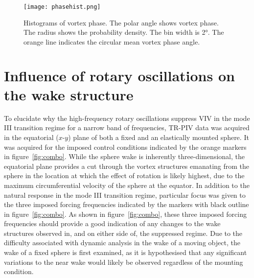 \documentclass[3p]{elsarticle}
\begin{document}
\begin{figure}
	\centering
	\texttt{[image: phasehist.png]} %
	\caption{Histograms of vortex phase. The polar angle shows vortex phase. The radius shows the probability density. The bin width is \ang{2}. The orange line indicates the circular mean vortex phase angle.}
	\label{fig:phasehist}
\end{figure}
%

\section{Influence of rotary oscillations on the wake structure} \label{sec:wake}%
To elucidate why the high-frequency rotary oscillations suppress VIV in the mode III transition regime for a
narrow band of frequencies, TR-PIV data was acquired in the
equatorial ($x$-$y$) plane of both a fixed and an elastically mounted
sphere. It was acquired for the imposed control conditions indicated by the orange markers in figure~\ref{fig:combo}. While the sphere wake is
inherently three-dimensional, the equatorial plane provides a cut
through the vortex structures emanating from the sphere in the location at
which the effect of rotation is likely highest, due to the maximum
circumferential velocity of the sphere at the equator. In addition to the natural response in the mode III transition regime, particular focus was given to the three imposed forcing frequencies indicated by the markers with black outline in figure~\ref{fig:combo}. As shown in figure~\ref{fig:combo}, these three imposed forcing frequencies should provide a good indication of any changes to the wake structures observed in, and on either side of, the suppressed regime. Due to the difficulty associated with dynamic analysis in the wake of a moving object, the
wake of a fixed sphere is first examined, as it is hypothesised that
any significant variations to the near wake would likely be observed
regardless of the mounting condition.
\end{document}
